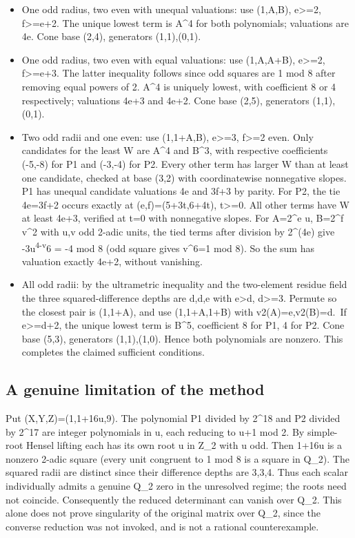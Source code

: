 \documentclass[
  10pt,
]{article}
\providecommand{\tightlist}{%
  \setlength{\itemsep}{0pt}\setlength{\parskip}{0pt}}
\begin{document}
\begin{itemize}
\tightlist
\item
  One odd radius, two even with unequal valuations: use (1,A,B),
  e\textgreater=2, f\textgreater=e+2. The unique lowest term is A\^{}4
  for both polynomials; valuations are 4e. Cone base (2,4), generators
  (1,1),(0,1).
\item
  One odd radius, two even with equal valuations: use (1,A,A+B),
  e\textgreater=2, f\textgreater=e+3. The latter inequality follows
  since odd squares are 1 mod 8 after removing equal powers of 2. A\^{}4
  is uniquely lowest, with coefficient 8 or 4 respectively; valuations
  4e+3 and 4e+2. Cone base (2,5), generators (1,1),(0,1).
\item
  Two odd radii and one even: use (1,1+A,B), e\textgreater=3,
  f\textgreater=2 even. Only candidates for the least W are A\^{}4 and
  B\^{}3, with respective coefficients (-5,-8) for P1 and (-3,-4) for
  P2. Every other term has larger W than at least one candidate, checked
  at base (3,2) with coordinatewise nonnegative slopes. P1 has unequal
  candidate valuations 4e and 3f+3 by parity. For P2, the tie 4e=3f+2
  occurs exactly at (e,f)=(5+3t,6+4t), t\textgreater=0. All other terms
  have W at least 4e+3, verified at t=0 with nonnegative slopes. For
  A=2\^{}e u, B=2\^{}f v\^{}2 with u,v odd 2-adic units, the tied terms
  after division by 2\^{}(4e) give -3u\textsuperscript{4-v}6 = -4 mod 8
  (odd square gives v\^{}6=1 mod 8). So the sum has valuation exactly
  4e+2, without vanishing.
\item
  All odd radii: by the ultrametric inequality and the two-element
  residue field the three squared-difference depths are d,d,e with
  e\textgreater d, d\textgreater=3. Permute so the closest pair is
  (1,1+A), and use (1,1+A,1+B) with v2(A)=e,v2(B)=d.~If
  e\textgreater=d+2, the unique lowest term is B\^{}5, coefficient 8 for
  P1, 4 for P2. Cone base (5,3), generators (1,1),(1,0). Hence both
  polynomials are nonzero. This completes the claimed sufficient
  conditions.
\end{itemize}

\subsection{A genuine limitation of the
method}\label{a-genuine-limitation-of-the-method}

Put (X,Y,Z)=(1,1+16u,9). The polynomial P1 divided by 2\^{}18 and P2
divided by 2\^{}17 are integer polynomials in u, each reducing to u+1
mod 2. By simple-root Hensel lifting each has its own root u in Z\_2
with u odd. Then 1+16u is a nonzero 2-adic square (every unit congruent
to 1 mod 8 is a square in Q\_2). The squared radii are distinct since
their difference depths are 3,3,4. Thus each scalar individually admits
a genuine Q\_2 zero in the unresolved regime; the roots need not
coincide. Consequently the reduced determinant can vanish over Q\_2.
This alone does not prove singularity of the original matrix over Q\_2,
since the converse reduction was not invoked, and is not a rational
counterexample.
\end{document}
